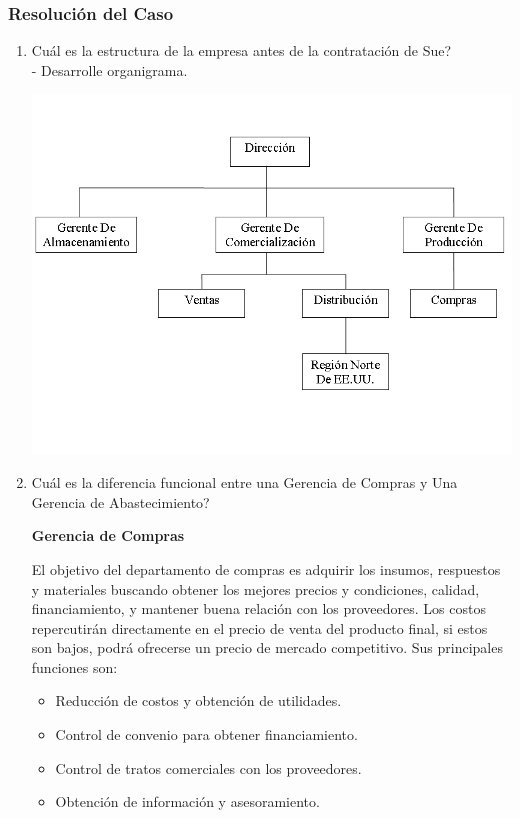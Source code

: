 \documentclass[a4paper,10pt,titlepage]{article}
\begin{document}
\subsubsection{Resoluci\'on del Caso}

\begin{enumerate}
  \item Cu\'al es la estructura de la empresa antes de la contrataci\'on de Sue?\\
  - Desarrolle organigrama.
     \begin{center}
      \includegraphics[scale=0.55]{./orgEmporioAutomotor.png}
     \end{center}
  
  \item Cu\'al es la diferencia funcional entre una Gerencia de Compras y Una Gerencia de Abastecimiento?

\textbf{Gerencia de Compras}

El objetivo del departamento de compras es adquirir los insumos, respuestos y materiales buscando obtener los mejores precios y condiciones, calidad, financiamiento, y mantener buena relaci\'on con los proveedores. Los costos repercutir\'an directamente en el precio de venta del producto final, si estos son bajos, podr\'a ofrecerse un precio de mercado competitivo. Sus principales funciones son: 
\begin{itemize}
\item Reducci\'on de costos y obtenci\'on de utilidades.
\item Control de convenio para obtener financiamiento.
\item Control de tratos comerciales con los proveedores.
\item Obtenci\'on de informaci\'on y asesoramiento.
\end{itemize}


\end{enumerate}
\end{document}
